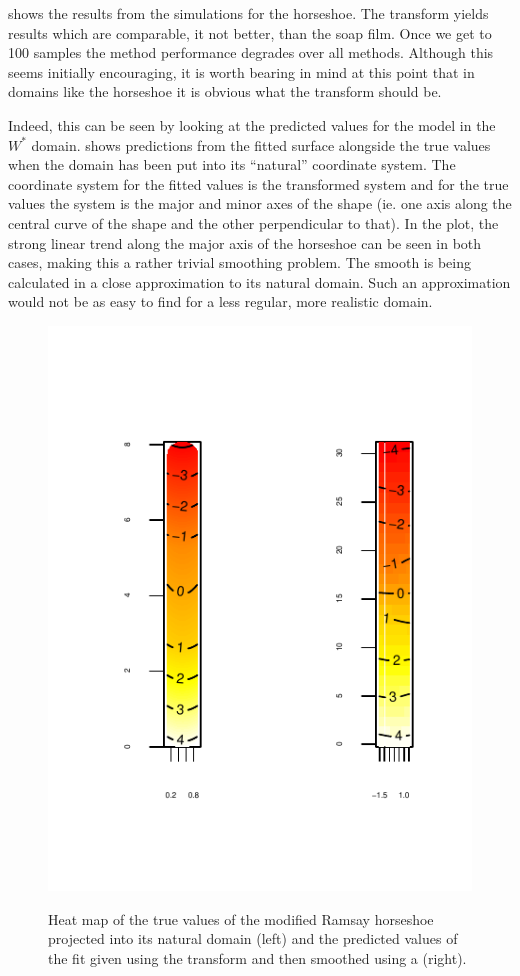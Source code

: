  shows the results from the simulations for the horseshoe. The \sch transform yields results which are comparable, it not better, than the soap film. Once we get to 100 samples the method performance degrades over all methods. Although this seems initially encouraging, it is worth bearing in mind at this point that in domains like the horseshoe it is obvious what the transform should be.

Indeed, this can be seen by looking at the predicted values for the model in the $W^*$ domain.  shows predictions from the fitted surface alongside the true values when the domain has been put into its ``natural'' coordinate system. The coordinate system for the fitted values is the \sch transformed system and for the true values the system is the major and minor axes of the shape (ie. one axis along the central curve of the shape and the other perpendicular to that). In the plot, the strong linear trend along the major axis of the horseshoe can be seen in both cases, making this a rather trivial smoothing problem. The smooth is being calculated in a close approximation to its natural domain. Such an approximation would not be as easy to find for a less regular, more realistic domain.

\begin{figure}
\centering
\includegraphics[trim=0in 0.5in 0in 0in]{sc/figs/hsvisgam.pdf} \\
\caption{Heat map of the true values of the modified Ramsay horseshoe projected into its natural domain (left) and the predicted values of the fit given using the \sch transform and then smoothed using a \tprs (right).}
\label{hsvisgam}
\end{figure}

